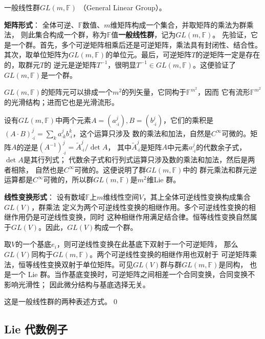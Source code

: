 
\begin{example}\label{chlg:exm_GL}
    一般线性群$GL(m,\mathbb{F})$ （General Linear Group）。
\end{example}
\textbf{矩阵形式}：
全体可逆、$\mathbb{F}$数值、$m$维矩阵构成一个集合，并取矩阵的乘法为群乘法，
则此集合构成一个群，称为$\mathbb{F}$值\textbf{一般线性群}，记为$GL(m,\mathbb{F})$。
先验证，它是一个群。首先，多个可逆矩阵相乘后还是可逆矩阵，乘法具有封闭性、结合性。
其次，取单位矩阵为$GL(m,\mathbb{F})$的单位元。最后，可逆矩阵$T$的逆矩阵一定是存在的，取群元$T$的
逆元是逆矩阵$T^{-1}$，很明显$T^{-1}\in GL(m,\mathbb{F})$。这便验证了$GL(m,\mathbb{F})$是一个群。

$GL(m,\mathbb{F})$的矩阵元可以排成一个$m^2$的列矢量，它同构于$\mathbb{F}^{m^2}$，因而
它有流形$\mathbb{F}^{m^2}$的光滑结构；进而它也是光滑流形。

设有$GL(m,\mathbb{F})$中两个元素$A=(a^j_{\cdot i}), B=(b^j_{\cdot i})$，它们的乘积是
$(A\cdot B)^{j}_{\cdot i} = \sum_{k} a^j_{\cdot k} b^k_{\cdot i}$，这个运算只涉及
数的乘法和加法，自然是$C^\infty$可微的。矩阵$A$的逆是$(A^{-1})^{j}_{\cdot i}=\tilde{A}^{j}_{\cdot i}/{\det A}$，
其中$\tilde{A}^{j}_{\cdot i}$是矩阵$A$中元素$a^{j}_{\cdot i}$的代数余子式，$\det A$是其行列式；
代数余子式和行列式运算只涉及数的乘法和加法，然后是两者相除，
自然也是$C^\infty$可微的。这便说明了群$GL(m,\mathbb{F})$中的
群元乘法和群元逆运算都是$C^\infty$可微的，所以群$GL(m,\mathbb{F})$是$m^2$维{\kaishu  Lie 群}。


\textbf{线性变换形式}：
设有数域$\mathbb{F}$上$m$维线性空间$V$，其上全体可逆线性变换构成集合$GL(V)$，群乘法
定义为两个可逆线性变换的相继作用。多个可逆线性变换的相继作用仍是可逆线性变换，同时
这种相继作用满足结合律。恒等线性变换自然属于$GL(V)$。因此，$GL(V)$构成一个群。

取$V$的一个基底$e_i$，则可逆线性变换在此基底下双射于一个可逆矩阵，
那么$GL(V)$同构于$GL(m,\mathbb{F})$。两个可逆线性变换的相继作用也双射于
可逆矩阵乘法，恒等线性变换双射于单位矩阵。可见$GL(V)$群与群$GL(m,\mathbb{F})$是同构，
也是一个 Lie 群。当作基底变换时，可逆矩阵之间相差一个合同变换，合同变换不影响光滑性；
因此微分结构与基底选择无关。

这是一般线性群的两种表述方式。\qed



\subsection{ Lie 代数例子}

